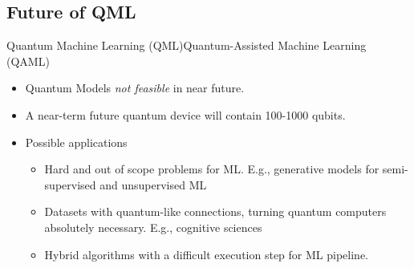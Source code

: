 \documentclass[aspectratio=169, handout]{beamer}
\theoremstyle{example}
\begin{document}
\subsection{Future of QML }
\begin{frame}{Quantum Machine Learning (QML)}{Quantum-Assisted Machine Learning (QAML)}
    \begin{itemize}
        \pause\item{Quantum Models \emph{not feasible} in near future.
    }
    \pause\item{A near-term future quantum device will contain 100-1000 qubits.
    
    }
    \pause\item
    Possible applications
    \pause
    \begin{itemize}
\pause\item Hard and out of scope problems for ML. E.g., generative models for semi-supervised and unsupervised ML
\pause\item Datasets with quantum-like connections, turning quantum computers absolutely necessary. E.g., cognitive sciences
\pause\item Hybrid algorithms with a difficult execution step for ML pipeline.
\end{itemize}
    \end{itemize}
\end{frame}
\end{document}
